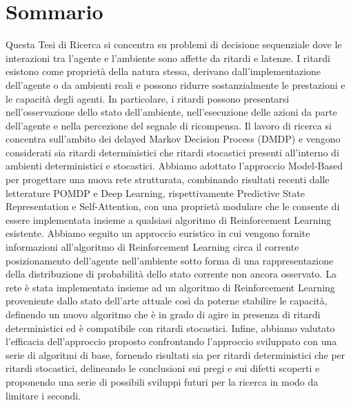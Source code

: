 \chapter*{Sommario}
Questa Tesi di Ricerca si concentra su problemi di decisione sequenziale dove le interazioni tra l'agente e l'ambiente sono affette da ritardi e latenze. I ritardi esistono come proprietà della natura stessa, derivano dall'implementazione dell'agente o da ambienti reali e possono ridurre sostanzialmente le prestazioni e le capacità degli agenti. In particolare, i ritardi possono presentarsi nell'osservazione dello stato dell'ambiente, nell'esecuzione delle azioni da parte dell'agente e nella percezione del segnale di ricompensa. Il lavoro di ricerca si concentra sull'ambito dei delayed Markov Decision Process (DMDP) e vengono considerati sia ritardi deterministici che ritardi stocastici presenti all'interno di ambienti deterministici e stocastici. Abbiamo adottato l'approccio Model-Based per progettare una nuova rete strutturata, combinando risultati recenti dalle letterature POMDP e Deep Learning, rispettivamente Predictive State Representation e Self-Attention, con una proprietà modulare che le consente di essere implementata insieme a qualsiasi algoritmo di Reinforcement Learning esistente. Abbiamo seguito un approccio euristico in cui vengono fornite informazioni all'algoritmo di Reinforcement Learning circa il corrente posizionamento dell'agente nell'ambiente sotto forma di una rappresentazione della distribuzione di probabilità dello stato corrente non ancora osservato. La rete è stata implementata insieme ad un algoritmo di Reinforcement Learning proveniente dallo stato dell'arte attuale così da poterne stabilire le capacità, definendo un nuovo algoritmo che è in grado di agire in presenza di ritardi deterministici ed è compatibile con ritardi stocastici. Infine, abbiamo valutato l'efficacia dell'approccio proposto confrontando l'approccio sviluppato con una serie di algoritmi di base, fornendo risultati sia per ritardi deterministici che per ritardi stocastici, delineando le conclusioni sui pregi e sui difetti scoperti e proponendo una serie di possibili sviluppi futuri per la ricerca in modo da limitare i secondi.

